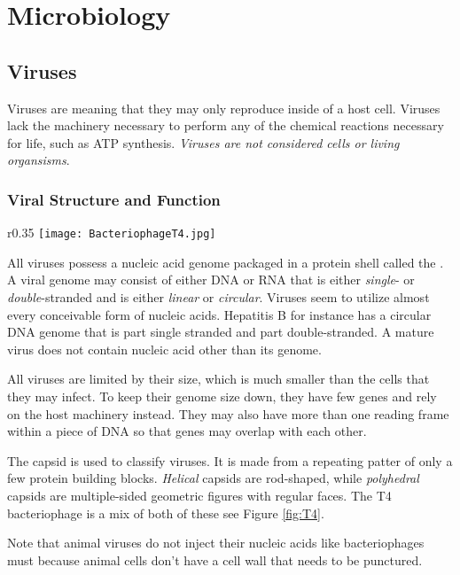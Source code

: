 \documentclass[../Bio_chemistryReview.tex]{subfiles}
\begin{document}
\chapter{Microbiology}
\section{Viruses}
Viruses are  meaning that they may
only reproduce inside of a host cell. Viruses lack the machinery necessary to
perform any of the chemical reactions necessary for life, such as ATP synthesis.
\textit{Viruses are not considered cells or living organsisms}.

\subsection{Viral Structure and Function}
\begin{wrapfigure}{r}{0.35\textwidth}
    \centering
    \vspace{-11pt} 
    \texttt{[image: BacteriophageT4.jpg]}
    \caption{Bacteriophage T4}
    \label{fig:T4}
\end{wrapfigure}
All viruses possess a nucleic acid genome packaged in a protein shell called the
. A viral genome may consist of either DNA or RNA that is either
\textit{single}- or \textit{double}-stranded and is either \textit{linear} or
\textit{circular}.  Viruses seem to utilize almost every conceivable form of
nucleic acids.  Hepatitis B for instance has a circular DNA genome that is part
single stranded and part double-stranded. A mature virus does not contain
nucleic acid other than its genome.\par

All viruses are limited by their size, which is much smaller than the cells that
they may infect. To keep their genome size down, they have few genes and rely on
the host machinery instead. They may also have more than one reading frame
within a piece of DNA so that genes may overlap with each other.\par

The capsid is used to classify viruses. It is made from a repeating patter of
only a few protein building blocks. \textit{Helical} capsids are rod-shaped,
while \textit{polyhedral} capsids are multiple-sided geometric figures with
regular faces. The T4 bacteriophage is a mix of both of these see Figure
\ref{fig:T4}.\par
Note that animal viruses do not inject their nucleic acids like bacteriophages
must because animal cells don't have a cell wall that needs to be punctured.\par
\end{document}
